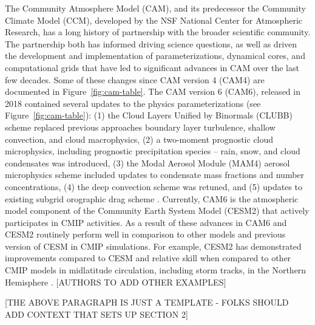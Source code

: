 \documentclass[draft]{agujournal2019}
\begin{document}
The Community Atmosphere Model (CAM), and its predecessor the Community Climate Model (CCM), developed by the NSF National Center for Atmospheric Research, has a long history of partnership with the broader scientific community.  The partnership both has informed driving science questions, as well as driven the development and implementation of parameterizations, dynamical cores, and computational grids that have led to significant advances in CAM over the last few decades. Some of these changes since CAM version 4 (CAM4) are documented in Figure~\ref{fig:cam-table}. The CAM version 6 (CAM6), released in 2018 contained several updates to the physics parameterizations (see Figure~\ref{fig:cam-table}): (1) the Cloud Layers Unified by Binormals (CLUBB) scheme replaced previous approaches boundary layer turbulence, shallow convection, and cloud macrophysics, (2) a two-moment prognostic cloud microphysics, including prognostic precipitation species – rain, snow, and cloud condensates was introduced, (3) the Modal Aerosol Module (MAM4) aerosol microphysics scheme included updates to condensate mass fractions and number concentrations, (4) the deep convection scheme was retuned, and (5) updates to existing subgrid orographic drag scheme \cite{danabasoglu2020}.  Currently, CAM6 is the atmospheric model component of the Community Earth System Model (CESM2) \cite{danabasoglu2020} that actively participates in CMIP activities. As a result of these advances in CAM6 and CESM2 routinely perform well in comparison to other models and previous version of CESM in CMIP simulations.  For example, CESM2 has demonstrated improvements compared to CESM and relative skill when compared to other CMIP models in midlatitude circulation, including storm tracks, in the Northern Hemisphere \cite{simpson2020}. [AUTHORS TO ADD OTHER EXAMPLES]

[THE ABOVE PARAGRAPH IS JUST A TEMPLATE - FOLKS SHOULD ADD CONTEXT THAT SETS UP SECTION 2]
\end{document}
